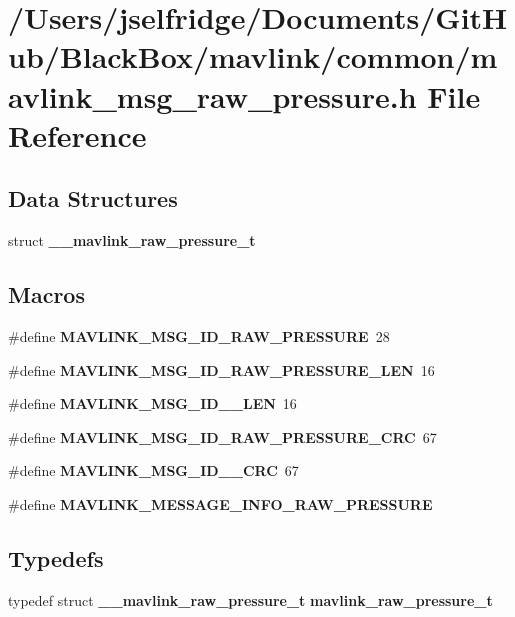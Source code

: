 \section{/\+Users/jselfridge/\+Documents/\+Git\+Hub/\+Black\+Box/mavlink/common/mavlink\+\_\+msg\+\_\+raw\+\_\+pressure.h File Reference}
\label{mavlink__msg__raw__pressure_8h}
\subsection*{Data Structures}
\begin{DoxyCompactItemize}
\item 
struct \textbf{ \+\_\+\+\_\+mavlink\+\_\+raw\+\_\+pressure\+\_\+t}
\end{DoxyCompactItemize}
\subsection*{Macros}
\begin{DoxyCompactItemize}
\item 
\#define \textbf{ M\+A\+V\+L\+I\+N\+K\+\_\+\+M\+S\+G\+\_\+\+I\+D\+\_\+\+R\+A\+W\+\_\+\+P\+R\+E\+S\+S\+U\+RE}~28
\item 
\#define \textbf{ M\+A\+V\+L\+I\+N\+K\+\_\+\+M\+S\+G\+\_\+\+I\+D\+\_\+\+R\+A\+W\+\_\+\+P\+R\+E\+S\+S\+U\+R\+E\+\_\+\+L\+EN}~16
\item 
\#define \textbf{ M\+A\+V\+L\+I\+N\+K\+\_\+\+M\+S\+G\+\_\+\+I\+D\+\_\+\_\+\+L\+EN}~16
\item 
\#define \textbf{ M\+A\+V\+L\+I\+N\+K\+\_\+\+M\+S\+G\+\_\+\+I\+D\+\_\+\+R\+A\+W\+\_\+\+P\+R\+E\+S\+S\+U\+R\+E\+\_\+\+C\+RC}~67
\item 
\#define \textbf{ M\+A\+V\+L\+I\+N\+K\+\_\+\+M\+S\+G\+\_\+\+I\+D\+\_\+\_\+\+C\+RC}~67
\item 
\#define \textbf{ M\+A\+V\+L\+I\+N\+K\+\_\+\+M\+E\+S\+S\+A\+G\+E\+\_\+\+I\+N\+F\+O\+\_\+\+R\+A\+W\+\_\+\+P\+R\+E\+S\+S\+U\+RE}
\end{DoxyCompactItemize}
\subsection*{Typedefs}
\begin{DoxyCompactItemize}
\item 
typedef struct \textbf{ \+\_\+\+\_\+mavlink\+\_\+raw\+\_\+pressure\+\_\+t} \textbf{ mavlink\+\_\+raw\+\_\+pressure\+\_\+t}
\end{DoxyCompactItemize}


